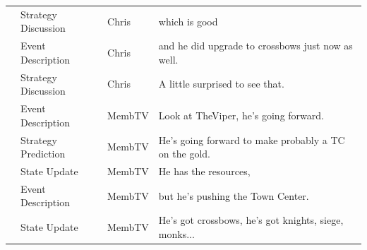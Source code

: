 {\begin{longtable}{@{}>{\theAppRow}r|L{2.3cm}L{1.0cm}U{11.55cm}@{}}
    & Strategy Discussion   & Chris        & which is good                                                                                                                                                                                                                                                    \\
    & Event Description     & Chris        & and he did upgrade to crossbows just now as well.                                                                                                                                                                                                                \\
    & Strategy Discussion   & Chris        & A little surprised to see that.                                                                                                                                                                                                                                  \\
    & Event Description     & MembTV       & Look at TheViper, he's going forward.                                                                                                                                                                                                                            \\
    & Strategy Prediction   & MembTV       & He's going forward to make probably a TC on the gold.                                                                                                                                                                                                            \\
    & State Update          & MembTV       & He has the resources,                                                                                                                                                                                                                                            \\
    & Event Description     & MembTV       & but he's pushing the Town Center.                                                                                                                                                                                                                                \\
    & State Update          & MembTV       & He's got crossbows, he's got knights, siege, monks...                                                                                                                                                                                                            \\

\end{longtable}}
